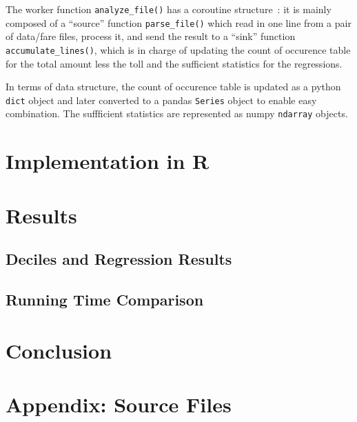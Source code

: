 \documentclass{article}
\begin{document}
The worker function \texttt{analyze\_file()} has a coroutine
structure~\cite{}: it is mainly composed of a ``source'' function
\texttt{parse\_file()} which read in one line from a pair of data/fare files,
process it, and send the result to a ``sink'' function
\texttt{accumulate\_lines()}, which is in charge of updating the count of
occurence table for the total amount less the toll and the sufficient statistics
for the regressions.

In terms of data structure, the count of occurence table is updated as a python
\texttt{dict} object and later converted to a pandas \texttt{Series} object to
enable easy combination. The suffficient statistics are represented as numpy
\texttt{ndarray} objects.

\section{Implementation in R}

\section{Results}

\subsection{Deciles and Regression Results}

\subsection{Running Time Comparison}

\section{Conclusion}








\pagebreak
\section*{Appendix: Source Files}
%
%
%


\end{document}
